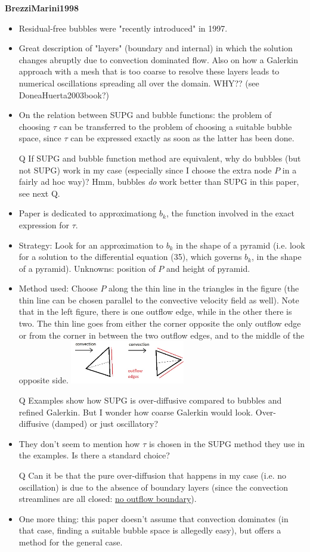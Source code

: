 \documentclass{article}
\begin{document}
\textbf{BrezziMarini1998}
\begin{itemize}
\item Residual-free bubbles were "recently introduced" in 1997.
\item Great description of "layers" (boundary and internal) in which the solution changes abruptly due to convection dominated flow. Also on how a Galerkin approach with a mesh that is too coarse to resolve these layers leads to numerical oscillations spreading all over the domain. WHY?? (see DoneaHuerta2003book?)
\item On the relation between SUPG and bubble functions: the problem of choosing $\tau$ can be transferred to the problem of choosing a suitable bubble space, since $\tau$ can be expressed exactly as soon as the latter has been done.
\item[Q] If SUPG and bubble function method are equivalent, why do bubbles (but not SUPG) work in my case (especially since I choose the extra node $P$ in a fairly ad hoc way)? Hmm, bubbles \emph{do} work better than SUPG in this paper, see next Q.
\item Paper is dedicated to approximationg $b_k$, the function involved in the exact expression for $\tau$.
\item Strategy: Look for an approximation to $b_k$ in the shape of a pyramid (i.e. look for a solution to the differential equation (35), which governs $b_k$, in the shape of a pyramid). Unknowns: position of $P$ and height of pyramid.
\item Method used: Choose $P$ along the thin line in the triangles in the figure (the thin line can be chosen parallel to the convective velocity field as well). Note that in the left figure, there is one outflow edge, while in the other there is two. The thin line goes from either the corner opposite the only outflow edge or from the corner in between the two outflow edges, and to the middle of the opposite side.
\includegraphics[width=5cm]{figures/BrezziMarini1998_img1.jpg}
\item[Q] Examples show how SUPG is over-diffusive compared to bubbles and refined Galerkin. But I wonder how coarse Galerkin would look. Over-diffusive (damped) or just oscillatory?
\item They don't seem to mention how $\tau$ is chosen in the SUPG method they use in the examples. Is there a standard choice?
\item[Q] Can it be that the pure over-diffusion that happens in my case (i.e. no oscillation) is due to the absence of boundary layers (since the convection streamlines are all closed: \underline{no outflow boundary}).
\item One more thing: this paper doesn't assume that convection dominates (in that case, finding a suitable bubble space is allegedly easy), but offers a method for the general case.
\end{itemize}
\end{document}
